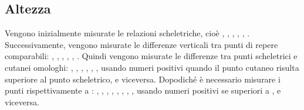 \subsection*{Altezza}
Vengono inizialmente misurate le relazioni scheletriche, cioè , , , , , . Successivamente, vengono misurate le differenze verticali tra punti di repere comparabili: , , , , , . Quindi vengono misurate le differenze tra punti scheletrici e cutanei omologhi: , , , , , , usando numeri positivi quando il punto cutaneo risulta superiore al punto scheletrico, e viceversa. Dopodiché è necessario misurare i punti rispettivamente a : , , , , , , , , usando numeri positivi se superiori a , e viceversa.


